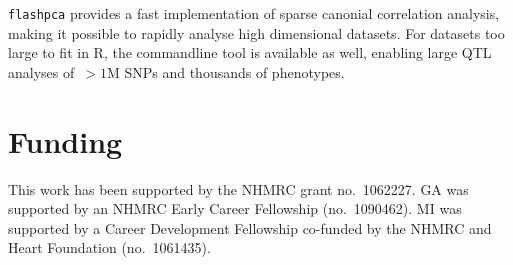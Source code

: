 \documentclass{bioinfo}
\begin{document}
\texttt{flashpca} provides a fast implementation of sparse canonial correlation
analysis, making it possible to rapidly analyse high dimensional datasets.
For datasets too large to fit in \textsf{R}, the commandline tool is
available as well, enabling large QTL analyses of~${>}1$M SNPs and thousands
of phenotypes.\vspace*{-12pt}

\section*{Funding}

This work has been supported by the NHMRC grant no.~1062227. GA was supported
by an NHMRC Early Career Fellowship (no.~1090462). MI was supported by a
Career Development Fellowship co-funded by the NHMRC and Heart Foundation
(no.~1061435).\vspace*{-12pt}




%
%
%
%
%
%
%
\end{document}
